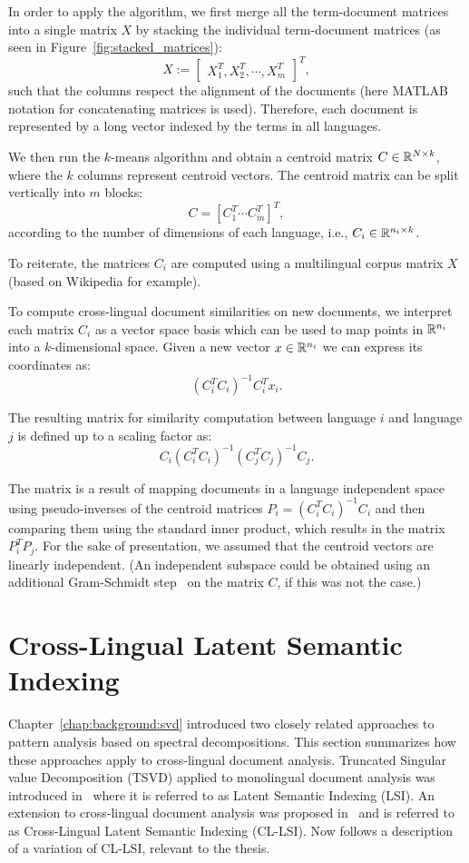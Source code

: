 In order to apply the algorithm, we first merge all the term-document matrices into a single matrix
$X$ by stacking the individual term-document matrices (as seen in Figure~\ref{fig:stacked_matrices}):
$$X := \begin{bmatrix}X_1^T ,X_2^T, \cdots, X_m^T \end{bmatrix}^T,$$
such that the columns respect the alignment of the documents (here MATLAB notation for concatenating
matrices is used). Therefore, each document is represented by a long vector indexed by the terms in all languages.

We then run the $k$-means algorithm and obtain a centroid matrix $C \in \mathbb{R}^{N \times k}$,
where the $k$ columns represent centroid vectors. The centroid matrix can be split vertically into $m$
blocks: $$C = [C_1^T \cdots C_m^T]^T,$$ according to the number of dimensions of each language,
i.e., $C_i \in \mathbb{R}^{n_i \times k}$.

To reiterate, the matrices $C_i$ are computed using a multilingual corpus
matrix $X$ (based on Wikipedia for example).

To compute  cross-lingual document similarities on new documents, we interpret each matrix $C_i$ 
as a vector space basis which can be used to map points in $\mathbb{R}^{n_i}$ into a $k$-dimensional space. Given
a new vector $x \in \mathbb{R}^{n_i}$ we can express its coordinates as:
$$(C_i^T C_i)^{-1} C_i^T x_i.$$

The resulting matrix for similarity computation between language $i$ and language $j$
is defined up to a scaling factor as:
$$C_i(C_i^T C_i)^{-1} (C_j^T C_j)^{-1} C_j.$$

The matrix is a result of mapping documents in a language independent space using
pseudo-inverses of the centroid matrices $P_i = (C_i^T C_i)^{-1} C_i$ and then
comparing them using the standard inner product, which results in the matrix
$P_i^T P_j$. For the sake of presentation, we assumed that the centroid vectors
are linearly independent. (An independent subspace could be obtained using an
additional Gram-Schmidt step~\cite{golub} on the matrix $C$, if this was not the case.)

\section{Cross-Lingual Latent Semantic Indexing}\label{chap:crosslingual:LSI}

Chapter~\ref{chap:background:svd} introduced two closely related approaches
to pattern analysis based on spectral decompositions. This section summarizes
how these approaches apply to cross-lingual document analysis. Truncated Singular
value Decomposition (TSVD) applied to monolingual document analysis was introduced 
in~\cite{lsi} where it is referred to as Latent Semantic Indexing (LSI). An extension
to cross-lingual document analysis was proposed in~\cite{cl_lsi} and is referred to as
Cross-Lingual Latent Semantic Indexing (CL-LSI). Now follows a description of a
variation of CL-LSI, relevant to the thesis.

